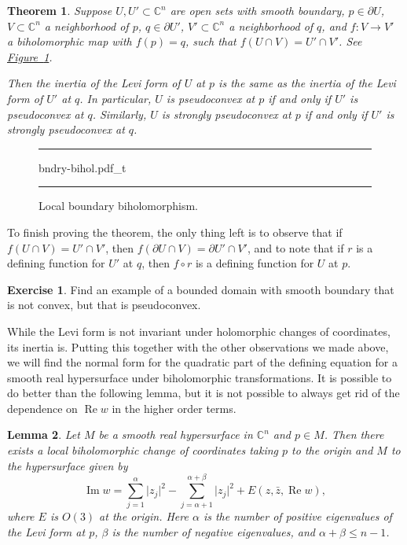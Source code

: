 \documentclass[12pt,openany]{book}
\renewcommand{\Re}{\operatorname{Re}}
\renewcommand{\Im}{\operatorname{Im}}
\newcommand{\sabs}[1]{\lvert {#1} \rvert}
\newcommand{\C}{{\mathbb{C}}}
\theoremstyle{plain}
\newtheorem{thm}{Theorem}[section]
\newtheorem{lemma}[thm]{Lemma}
\theoremstyle{remark}
\theoremstyle{definition}
\newenvironment{exbox}{%
    \def\FrameCommand{\vrule width 1pt \relax\hspace{10pt}}%
    \MakeFramed{\advance\hsize-\width\FrameRestore}%
}{%
    \endMakeFramed
}
\newenvironment{myfig}{%
\begin{figure}[h!t]
\noindent\rule{\textwidth}{0.5pt}\vspace{12pt}\par\centering}%
{\par\noindent\rule{\textwidth}{0.5pt}
\end{figure}}
\theoremstyle{exercise}
\newtheorem{exercise}{Exercise}[section]
\theoremstyle{example}
\newcommand{\figureref}[1]{\hyperref[#1]{Figure~\ref*{#1}}}
\begin{document}
\begin{thm}
Suppose $U, U' \subset \C^n$ are open sets with smooth boundary,
$p \in \partial U$, $V \subset \C^n$ a neighborhood of $p$,
$q \in \partial U'$, $V' \subset \C^n$ a neighborhood of $q$,
and $f \colon V \to V'$ a biholomorphic map with $f(p) = q$, such that
$f(U \cap V) = U' \cap V'$.
See \figureref{fig:bndry-bihol}.

Then the inertia of the Levi form of $U$ at $p$ is the same as the inertia of
the Levi form of $U'$ at $q$.
In particular, $U$ is pseudoconvex at $p$ if and only if $U'$ is pseudoconvex at $q$.
Similarly,
$U$ is strongly pseudoconvex at $p$ if and only if $U'$ is strongly pseudoconvex at $q$.
\end{thm}

\begin{myfig}
{bndry-bihol.pdf_t}
\caption{Local boundary biholomorphism.\label{fig:bndry-bihol}}
\end{myfig}

To finish proving the theorem, the only thing left is to observe that if
$f(U \cap V) = U' \cap V'$, then $f(\partial U \cap V) = \partial U' \cap
V'$, and to note that if $r$ is a defining function for $U'$ at $q$,
then $f \circ r$ is a defining function for $U$ at $p$.

\begin{exbox}
\begin{exercise}
Find an example of a bounded domain with smooth boundary that is not convex,
but that is pseudoconvex.
\end{exercise}
\end{exbox}

While the Levi form is not invariant under holomorphic changes of coordinates,
its inertia is.
Putting this together with the other observations we made above,
we will find the normal form for the
quadratic part of the defining equation for a smooth real hypersurface
under biholomorphic transformations.
It is possible to do better than the following lemma, but it is not possible
to always get rid of the dependence on $\Re w$ in the higher order terms.

\begin{lemma} \label{lemma:normformquad}
Let $M$ be a smooth real hypersurface in $\C^n$ and $p \in M$.  Then there
exists a local biholomorphic change of coordinates taking $p$ to the origin
and $M$ to the hypersurface given by
\begin{equation*}
\Im w = \sum_{j=1}^\alpha \sabs{z_j}^2 - \sum_{j=\alpha+1}^{\alpha+\beta}
\sabs{z_j}^2 +
E(z,\bar{z},\Re w) ,
\end{equation*}
where $E$ is $O(3)$ at the origin.
Here $\alpha$ is the number of positive eigenvalues of the Levi form at $p$,
$\beta$ is the number of negative eigenvalues, and $\alpha+\beta \leq
n-1$.
\end{lemma}
\end{document}

